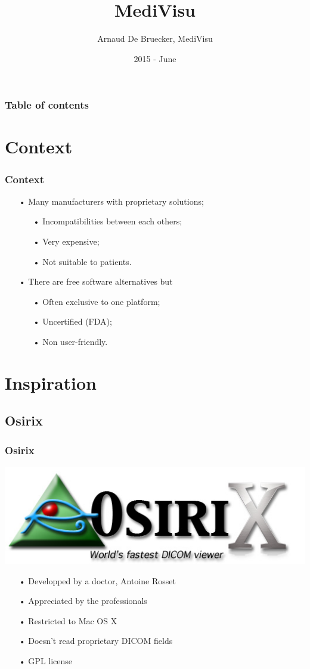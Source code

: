 \documentclass[11pt]{beamer}
\author{Arnaud De Bruecker, MediVisu}
\title{MediVisu}
\institute{HEB - ESI}
\date{2015 - June}
\begin{document}
\begin{frame}
\titlepage
\end{frame}

\begin{frame}
\frametitle{Table of contents}
\tableofcontents
\end{frame}

\section{Context}

\begin{frame}
\frametitle{Context}
\begin{itemize}[<+->]
\item[•] Many manufacturers with proprietary solutions;
\begin{itemize}[<+->]
\item[•] Incompatibilities between each others;
\item[•] Very expensive;
\item[•] Not suitable to patients.
\end{itemize}
\item[•] There are free software alternatives but
\begin{itemize}[<+->]
\item[•] Often exclusive to one platform;
\item[•] Uncertified (FDA);
\item[•] Non user-friendly.
\end{itemize}
\end{itemize}
\end{frame}

\section{Inspiration}

\subsection{Osirix}

\begin{frame}
\frametitle{Osirix}
\includegraphics[scale=0.17]{Osirix.jpg}
\begin{itemize}[<+->]
\item[•] Developped by a doctor, Antoine Rosset
\item[•] Appreciated by the professionals
\item[•] Restricted to Mac OS X
\item[•] Doesn't read proprietary DICOM fields
\item[•] GPL license
\end{itemize}
\end{frame}
\end{document}
